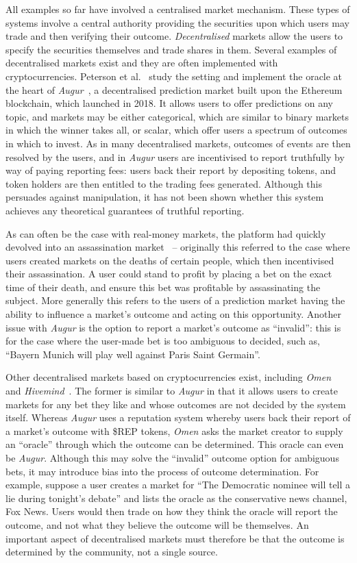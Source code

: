 All examples so far have involved a centralised market mechanism. These types
of systems involve a central authority providing the securities upon which
users may trade and then verifying their outcome. \emph{Decentralised} markets
allow the users to specify the securities themselves and trade shares in them.
Several examples of decentralised markets exist and they are often implemented
with cryptocurrencies. Peterson et al.~\cite{Peterson2015} study the setting
and implement the oracle at the heart of \emph{Augur}~\cite{Augur}, a
decentralised prediction market built upon the Ethereum blockchain, which
launched in 2018. It allows users to offer predictions on any topic, and
markets may be either categorical, which are similar to binary markets in which
the winner takes all, or scalar, which offer users a spectrum of outcomes in
which to invest. As in many decentralised markets, outcomes of events are then
resolved by the users, and in \emph{Augur} users are incentivised to report
truthfully by way of paying reporting fees: users back their report by
depositing tokens, and token holders are then entitled to the trading fees
generated.  Although this persuades against manipulation, it has not been shown
whether this system achieves any theoretical guarantees of truthful reporting.

As can often be the case with real-money markets, the platform had quickly
devolved into an assassination market~\cite{AugurDeathMarket} -- originally
this referred to the case where users created markets on the deaths of certain
people, which then incentivised their assassination. A user could stand to
profit by placing a bet on the exact time of their death, and ensure this bet
was profitable by assassinating the subject. More generally this refers to the
users of a prediction market having the ability to influence a market's outcome
and acting on this opportunity. Another issue with \emph{Augur} is the option
to report a market's outcome as ``invalid'': this is for the case where the
user-made bet is too ambiguous to decided, such as, ``Bayern Munich will play
well against Paris Saint Germain''.

Other decentralised markets based on cryptocurrencies exist, including
\emph{Omen}~\cite{Omen} and \emph{Hivemind}~\cite{Hivemind}. The former is
similar to \emph{Augur} in that it allows users to create markets for any bet
they like and whose outcomes are not decided by the system itself. Whereas
\emph{Augur} uses a reputation system whereby users back their report of a
market's outcome with \$REP tokens, \emph{Omen} asks the market creator to
supply an ``oracle'' through which the outcome can be determined. This oracle
can even be \emph{Augur}. Although this may solve the ``invalid'' outcome
option for ambiguous bets, it may introduce bias into the process of outcome
determination. For example, suppose a user creates a market for ``The
Democratic nominee will tell a lie during tonight's debate'' and lists the
oracle as the conservative news channel, Fox News. Users would then trade on
how they think the oracle will report the outcome, and not what they believe
the outcome will be themselves. An important aspect of decentralised markets
must therefore be that the outcome is determined by the community, not a single
source. 

